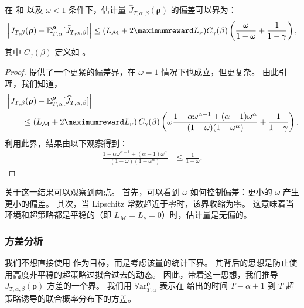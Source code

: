 \begin{lemma}
\label{lem:bias_bound}
在  和  以及 $\omega<1$ 条件下，估计量 $\widehat{J}_{T,\alpha,\beta}(\boldsymbol\rho)$ 的偏差可以界为：
\begin{align*}
    \left\vert J_{T,\beta}(\boldsymbol\rho) - \mathbb{E}^{\boldsymbol\rho}_{T,\alpha}[\widehat{J}_{T,\alpha,\beta}] \right\vert
    \le (L_{\mathcal{M}} + 2\maximumreward L_\nu)  C_\gamma(\beta)\left(\frac{\omega}{1-\omega} +\frac{1}{1-\gamma}\right),
\end{align*}
其中 $C_\gamma(\beta)$ 定义如 。
\end{lemma}
\begin{proof}
     提供了一个更紧的偏差界，在 $\omega=1$ 情况下也成立，但更复杂。
    由此引理，我们知道，
    \begin{align*}
        &\left\vert J_{T,\beta}(\boldsymbol\rho) - \mathbb{E}^{\boldsymbol\rho}_{T,\alpha}[\widehat{J}_{T,\alpha,\beta}] \right\vert
        \\
        &\qquad \le\left(L_{\mathcal{M}} + 2\maximumreward L_\nu\right) C_{\gamma}(\beta) \left(\omega
        \frac{1-\alpha\omega^{\alpha-1} + (\alpha-1) \omega^\alpha}{(1-\omega)(1-\omega^\alpha)} + \frac{1}{1-\gamma}\right).
    \end{align*}
    利用此界，结果由以下观察得到：
    \begin{align*}
        \frac{1-\alpha\omega^{\alpha-1} + (\alpha-1) \omega^\alpha}{(1-\omega)(1-\omega^\alpha)}
        & \leq \frac{1}{1-\omega} .
    \end{align*}
\end{proof}

关于这一结果可以观察到两点。
首先，可以看到 $\omega$ 如何控制偏差：更小的 $\omega$ 产生更小的偏差。
其次，当 Lipschitz 常数趋近于零时，该界收缩为零。
这意味着当环境和超策略都是平稳的（即 $L_{\mathcal{M}}=L_{\nu}=0$）时，估计量是无偏的。


\subsubsection{方差分析}
\label{subsec:variance_analysis}

我们不想直接使用  作为目标，而是考虑该量的统计下界。
其背后的思想是防止使用高度非平稳的超策略过拟合过去的动态。
因此，带着这一思想，我们推导 $\overline{J}_{T,\alpha,\beta}(\boldsymbol\rho)$ 方差的一个界。
我们用 $\mathbb{V}\mathrm{ar}^{\boldsymbol\rho}_{T,\alpha}$ 表示在  给出的时间 $T-\alpha+1$ 到 $T$ 超策略诱导的联合概率分布下的方差。

